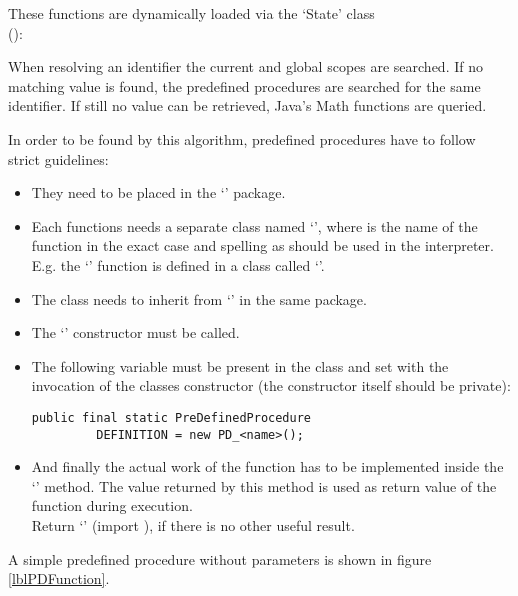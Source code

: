 These functions are dynamically loaded via the `State' class\\ ():

When resolving an identifier the current and global scopes are searched. If no matching value is found, the predefined procedures are searched for the same identifier. If still no value can be retrieved, Java's Math functions are queried.

In order to be found by this algorithm, predefined procedures have to follow strict guidelines:

\begin{itemize}
    \item They need to be placed in the `' package.
    \item Each functions needs a separate class named `', where  is the name of the function in the exact case and spelling as should be used in the interpreter.\\
        E.g. the `' function is defined in a class called `'.
    \item The class needs to inherit from `' in the same package.
    \item The `' constructor must be called.
    \item The following variable must be present in the class and set with the invocation of the classes constructor (the constructor itself should be private):
\begin{lstlisting}[frame=none,numbers=none]
public final static PreDefinedProcedure
         DEFINITION = new PD_<name>();
\end{lstlisting}
    \item And finally the actual work of the function has to be implemented inside the `' method. The value returned by this method is used as return value of the function during execution.\\
    Return `' (import ), if there is no other useful result.

\end{itemize}

A simple predefined procedure without parameters is shown in figure \ref{lblPDFunction}.


